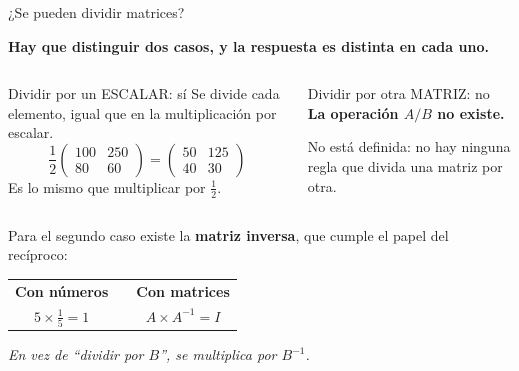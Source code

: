 \documentclass[aspectratio=169,10pt]{beamer}
\begin{document}
\begin{frame}{¿Se pueden dividir matrices?}

\begin{center}
\textbf{Hay que distinguir dos casos, y la respuesta es distinta en cada uno.}
\end{center}

\vspace{0.25cm}
\begin{columns}[T]
\begin{exampleblock}{Dividir por un ESCALAR: sí}
Se divide cada elemento, igual que en la multiplicación por escalar.
$$\frac{1}{2}\begin{pmatrix} 100 & 250 \\ 80 & 60 \end{pmatrix}
= \begin{pmatrix} 50 & 125 \\ 40 & 30 \end{pmatrix}$$
Es lo mismo que multiplicar por $\tfrac{1}{2}$.
\end{exampleblock}

\begin{alertblock}{Dividir por otra MATRIZ: no}
\textbf{La operación $A / B$ no existe.}

No está definida: no hay ninguna regla que divida una matriz por otra.
\end{alertblock}
\end{columns}

\vspace{0.15cm}
Para el segundo caso existe la \textbf{matriz inversa}, que cumple el papel del recíproco:

\begin{center}
\begin{tabular}{ccc}
\textbf{Con números} & \qquad & \textbf{Con matrices} \\
$5 \times \tfrac{1}{5} = 1$ & & $A \times A^{-1} = I$ \\
\end{tabular}
\end{center}

\begin{center}
\textit{En vez de ``dividir por $B$'', se multiplica por $B^{-1}$.}
\end{center}
\end{frame}
\end{document}
